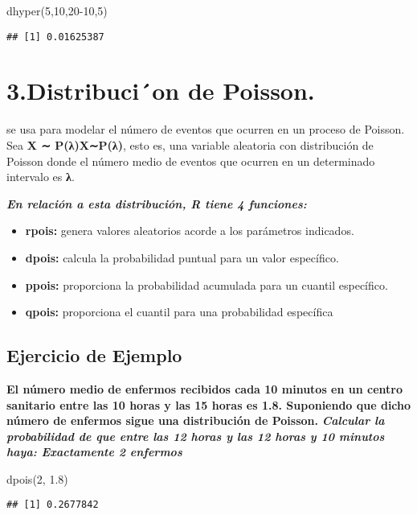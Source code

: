 \documentclass[
]{article}
\newenvironment{Shaded}{\begin{snugshade}}{\end{snugshade}}
\newcommand{\DecValTok}[1]{\textcolor[rgb]{0.00,0.00,0.81}{#1}}
\newcommand{\FloatTok}[1]{\textcolor[rgb]{0.00,0.00,0.81}{#1}}
\newcommand{\FunctionTok}[1]{\textcolor[rgb]{0.00,0.00,0.00}{#1}}
\newcommand{\NormalTok}[1]{#1}
\begin{document}
\begin{Shaded}
\begin{Highlighting}[]
\FunctionTok{dhyper}\NormalTok{(}\DecValTok{5}\NormalTok{,}\DecValTok{10}\NormalTok{,}\DecValTok{20{-}10}\NormalTok{,}\DecValTok{5}\NormalTok{)}
\end{Highlighting}
\end{Shaded}

\begin{verbatim}
## [1] 0.01625387
\end{verbatim}

\hypertarget{distribucion-de-poisson.}{%
\section{3.Distribuci´on de Poisson.}\label{distribucion-de-poisson.}}

se usa para modelar el número de eventos que ocurren en un proceso de
Poisson. Sea \textbf{X ∼ P(λ)X∼P(λ)}, esto es, una variable aleatoria
con distribución de Poisson donde el número medio de eventos que ocurren
en un determinado intervalo es \textbf{λ}.

\textbf{\emph{En relación a esta distribución, R tiene 4 funciones:}}

\begin{itemize}
\item
  \textbf{rpois:} genera valores aleatorios acorde a los parámetros
  indicados.
\item
  \textbf{dpois:} calcula la probabilidad puntual para un valor
  específico.
\item
  \textbf{ppois:} proporciona la probabilidad acumulada para un cuantil
  específico.
\item
  \textbf{qpois:} proporciona el cuantil para una probabilidad
  específica
\end{itemize}

\hypertarget{ejercicio-de-ejemplo-1}{%
\subsection{Ejercicio de Ejemplo}\label{ejercicio-de-ejemplo-1}}

\textbf{El número medio de enfermos recibidos cada 10 minutos en un
centro sanitario entre las 10 horas y las 15 horas es 1.8. Suponiendo
que dicho número de enfermos sigue una distribución de Poisson.}
\textbf{\emph{Calcular la probabilidad de que entre las 12 horas y las
12 horas y 10 minutos haya: Exactamente 2 enfermos}}

\begin{Shaded}
\begin{Highlighting}[]
\FunctionTok{dpois}\NormalTok{(}\DecValTok{2}\NormalTok{, }\FloatTok{1.8}\NormalTok{)}
\end{Highlighting}
\end{Shaded}

\begin{verbatim}
## [1] 0.2677842
\end{verbatim}
\end{document}
